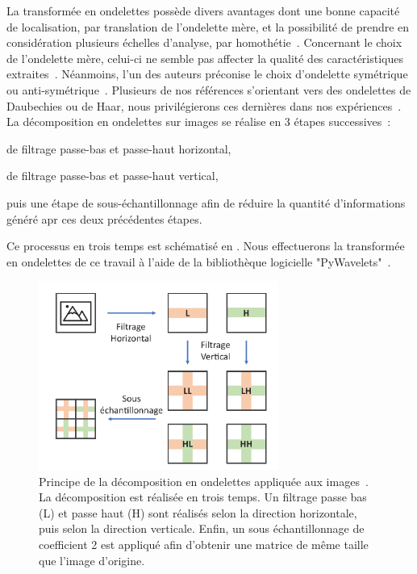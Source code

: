 La transformée en ondelettes possède divers avantages dont une bonne capacité de localisation, par translation de l'ondelette mère, et la possibilité de prendre en considération plusieurs échelles d'analyse, par homothétie~\cite{Livens1997,Wiltgen2008}. Concernant le choix de l'ondelette mère, celui-ci ne semble pas affecter la qualité des caractéristiques extraites~\cite{Fatemi1996, Livens1997}. Néanmoins, l'un des auteurs préconise le choix d'ondelette symétrique ou anti-symétrique~\cite{Livens1997}. Plusieurs de nos références s'orientant vers des ondelettes de Daubechies ou de Haar, nous privilégierons ces dernières dans nos expériences~\cite{Wiltgen2008,Halimi2017a}. La décomposition en ondelettes sur images se réalise en 3 étapes successives~: 
\begin{inlinerate}
    \item de filtrage passe-bas et passe-haut horizontal,
    \item de filtrage passe-bas et passe-haut vertical,
    \item puis une étape de sous-échantillonnage afin de réduire la quantité d'informations généré apr ces deux précédentes étapes.
\end{inlinerate} Ce processus en trois temps est schématisé en . Nous effectuerons la transformée en ondelettes de ce travail à l'aide de la bibliothèque logicielle "PyWavelets"~\cite{lee2006}.\par

\begin{figure}[H]
    \centering
    \includegraphics[width=0.7\textwidth]{contents/chapter_4/resources/scheme_dwt.pdf}
    \caption{Principe de la décomposition en ondelettes appliquée aux images~\cite{Livens1997}. La décomposition est réalisée en trois temps. Un filtrage passe bas (L) et passe haut (H) sont réalisés selon la direction horizontale, puis selon la direction verticale. Enfin, un sous échantillonnage de coefficient 2 est appliqué afin d'obtenir une matrice de même taille que l'image d'origine.}
    \label{fig:scheme_dwt}
\end{figure}\par 

